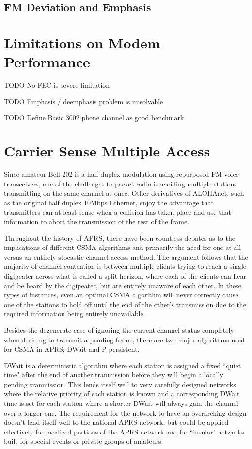 \subsection{FM Deviation and Emphasis}

\section{Limitations on Modem Performance}

TODO No FEC is severe limitation

TODO Emphasis / deemphasis problem is unsolvable

TODO Define Basic 3002 phone channel as good benchmark

\section{Carrier Sense Multiple Access}
\label{sec:bell202csma}

Since amateur Bell 202 is a half duplex modulation using repurposed 
FM voice transceivers, 
one of the challenges to packet radio is avoiding multiple stations
transmitting on the same channel at once. 
Other derivatives of ALOHAnet, 
such as the original half duplex 10Mbps Ethernet, 
enjoy the advantage that transmitters can
at least sense when a collision has taken place 
and use that information to abort the transmission of the rest of the frame.

Throughout the history of APRS, there have been 
countless debates as to the implications
of different CSMA algorithms and primarily 
the need for one at all versus an entirely 
stocastic channel access method. The argument follows that the majority of 
channel contention is between multiple clients trying to reach a single digipeater
across what is called a split horizon, where each of the clients can hear and be heard
by the digipeater, but are entirely unaware of each other. In these types of instances,
even an optimal CSMA algorithm will never correctly cause one of the stations to hold 
off until the end of the other's transmission due to the required information being
entirely unavailable.

Besides the degenerate case of ignoring the current channel status completely when 
deciding to transmit a pending frame, there are two major algorithms used for CSMA
in APRS;
DWait and P-persistent.

DWait is a deterministic algorithm where each station is assigned a fixed
``quiet time" after the end of another tranmission before they will begin a locally
pending tranmission. This lends itself well to very carefully designed networks
where the relative priority of each station is known and a corresponding DWait time
is set for each station where a shorter DWait will always gain the channel over a longer
one. The requirement for the network to have an overarching design doesn't lend itself
well to the national APRS network, but could be applied effectively for localized 
portions of the APRS network and for ``insular" networks built for special events or
private groups of amateurs.

